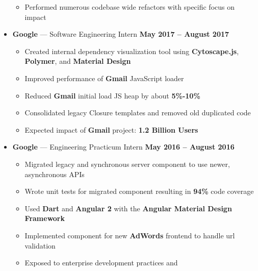 \documentclass[10pt, oneside]{letter}
\newcommand{\textapprox}{\raisebox{0.5ex}{\texttildelow}}
\begin{document}
\begin{adjustwidth}{0.1in}{0pt}
\begin{itemize}
\begin{itemize}
              \item {
                  Performed numerous codebase wide refactors with specific focus
                  on impact
              }
            \end{itemize}
        \item
          \textbf{Google} --- Software Engineering Intern \hfill \textbf{May 2017 -- August 2017}
            \begin{itemize}
              \item {
                  Created internal dependency visualization tool using
                  \textbf{Cytoscape.js}, \textbf{Polymer}, and \textbf{Material
                    Design}
              }
              \item Improved performance of \textbf{Gmail} JavaScript loader
              \item {
                  Reduced \textbf{Gmail} initial load JS heap by about
                  \textbf{5\%-10\%}
              }
              \item {
                  Consolidated legacy Closure templates and removed old
                  duplicated code
              }
              \item {
                  Expected impact of \textbf{Gmail} project:
                  \textbf{\textapprox 1.2 Billion Users}
              }
            \end{itemize}
        \item
          \textbf{Google} --- Engineering Practicum Intern \hfill \textbf{May 2016 -- August 2016}
            \begin{itemize}
              \item {
                  Migrated legacy and synchronous server component to use
                  newer, asynchronous APIs
              }
              \item {
                  Wrote unit tests for migrated component resulting in
                  \textbf{94\%} code coverage
              }
              \item {
                  Used \textbf{Dart} and \textbf{Angular 2} with the
                  \textbf{Angular Material Design Framework}
              }
              \item {
                  Implemented component for new \textbf{AdWords} frontend to
                  handle url validation
              }
              \item {
                  Exposed to enterprise development practices and
}
\end{itemize}
\end{itemize}
\end{adjustwidth}
\end{document}

